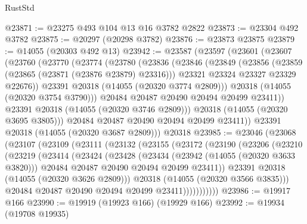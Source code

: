 \begin{lexlean}{RustStd}
\begin{coremodule}
@23871 := @23275 @493 @104 @13 @16 @3782 @2822
@23873 := @23304 @492 @3782
@23875 := @20297 (@20298 @3782)
@23876 := @23873 @23875
@23879 := @14055 (@20303 @492 @13)
@23942 := @23587
    (@23597
      (@23601
        (@23607
          (@23760
            (@23770
              (@23774
                (@23780
                  (@23836
                    (@23846
                      (@23849
                        (@23856
                          (@23859 (@23865 (@23871 (@23876 @23879) @23316)))
                          @23321
                          @23324
                          @23327
                          @23329
                          @22676))
                      @23391
                      @20318
                      (@14055 (@20320 @3774 @2809)))
                    @20318
                    (@14055 (@20320 @3754 @3790)))
                  @20484
                  @20487
                  @20490
                  @20494
                  @20499
                  @23411))
              @23391
              @20318
              (@14055 (@20320 @3746 @2809)))
            @20318
            (@14055 (@20320 @3695 @3805)))
          @20484
          @20487
          @20490
          @20494
          @20499
          @23411))
      @23391
      @20318
      (@14055 (@20320 @3687 @2809)))
    @20318
@23985 := @23046
    (@23068
      (@23107
        (@23109
          (@23111
            (@23132
              (@23155
                (@23172
                  (@23190
                    (@23206
                      (@23210
                        (@23219
                          (@23414
                            (@23424
                              (@23428
                                (@23434
                                  (@23942 (@14055 (@20320 @3633 @3820)))
                                  @20484
                                  @20487
                                  @20490
                                  @20494
                                  @20499
                                  @23411))
                              @23391
                              @20318
                              (@14055 (@20320 @3626 @2809)))
                            @20318
                            (@14055 (@20320 @3566 @3835)))
                          @20484
                          @20487
                          @20490
                          @20494
                          @20499
                          @23411)))))))))))
@23986 := @19917 @166
@23990 := @19919 (@19923 @166) (@19929 @166)
@23992 := @19934 (@19708 @19935)

\end{coremodule}
\end{lexlean}
